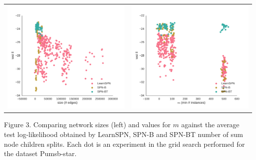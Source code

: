 \documentclass[final]{beamer}
\begin{document}
\begin{frame}{}
\begin{textblock}{25.2}
    \begin{center}
      \begin{table}[ht]
        \setlength{\tabcolsep}{30pt}  
        \begin{tabular}{c c}
          \includegraphics[width=0.4\linewidth]{figures/ll-depth/pumsb-star-ll-depth}&\includegraphics[width=0.4\linewidth]{figures/ll-m/pumsb-star-ll-m}
        \end{tabular}
      \end{table}
    \end{center}

    \vspace{-20pt}
    \begin{center}
      \begin{minipage}[t]{0.9\linewidth}
        \tiny\flushleft
        Figure 3. Comparing network sizes (left) and values for $m$
        against the  average test
        log-likelihood obtained by \textsf{LearnSPN}, \textsf{SPN-B} and
        \textsf{SPN-BT}
        number of sum node children splits. Each dot is an experiment
        in the grid search performed for the dataset Pumsb-star.
      \end{minipage}
    \end{center}

  \end{textblock}
  
  

\end{frame}
\end{document}
